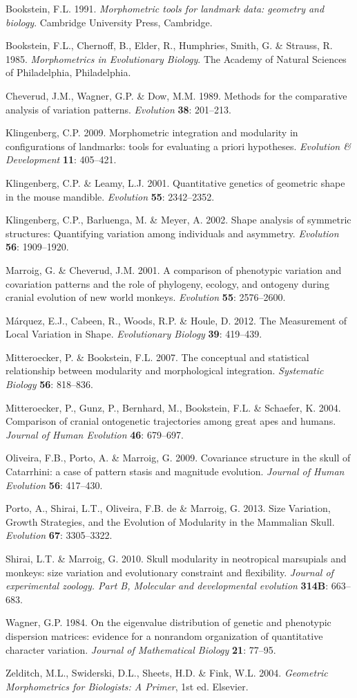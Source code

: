 \documentclass[12pt,]{article}
\begin{document}
Bookstein, F.L. 1991. \emph{Morphometric tools for landmark data:
geometry and biology}. Cambridge University Press, Cambridge.

Bookstein, F.L., Chernoff, B., Elder, R., Humphries, Smith, G. \&
Strauss, R. 1985. \emph{Morphometrics in Evolutionary Biology}. The
Academy of Natural Sciences of Philadelphia, Philadelphia.

Cheverud, J.M., Wagner, G.P. \& Dow, M.M. 1989. Methods for the
comparative analysis of variation patterns. \emph{Evolution}
\textbf{38}: 201--213.

Klingenberg, C.P. 2009. Morphometric integration and modularity in
configurations of landmarks: tools for evaluating a priori hypotheses.
\emph{Evolution \& Development} \textbf{11}: 405--421.

Klingenberg, C.P. \& Leamy, L.J. 2001. Quantitative genetics of
geometric shape in the mouse mandible. \emph{Evolution} \textbf{55}:
2342--2352.

Klingenberg, C.P., Barluenga, M. \& Meyer, A. 2002. Shape analysis of
symmetric structures: Quantifying variation among individuals and
asymmetry. \emph{Evolution} \textbf{56}: 1909--1920.

Marroig, G. \& Cheverud, J.M. 2001. A comparison of phenotypic variation
and covariation patterns and the role of phylogeny, ecology, and
ontogeny during cranial evolution of new world monkeys. \emph{Evolution}
\textbf{55}: 2576--2600.

Márquez, E.J., Cabeen, R., Woods, R.P. \& Houle, D. 2012. The
Measurement of Local Variation in Shape. \emph{Evolutionary Biology}
\textbf{39}: 419--439.

Mitteroecker, P. \& Bookstein, F.L. 2007. The conceptual and statistical
relationship between modularity and morphological integration.
\emph{Systematic Biology} \textbf{56}: 818--836.

Mitteroecker, P., Gunz, P., Bernhard, M., Bookstein, F.L. \& Schaefer,
K. 2004. Comparison of cranial ontogenetic trajectories among great apes
and humans. \emph{Journal of Human Evolution} \textbf{46}: 679--697.

Oliveira, F.B., Porto, A. \& Marroig, G. 2009. Covariance structure in
the skull of Catarrhini: a case of pattern stasis and magnitude
evolution. \emph{Journal of Human Evolution} \textbf{56}: 417--430.

Porto, A., Shirai, L.T., Oliveira, F.B. de \& Marroig, G. 2013. Size
Variation, Growth Strategies, and the Evolution of Modularity in the
Mammalian Skull. \emph{Evolution} \textbf{67}: 3305--3322.

Shirai, L.T. \& Marroig, G. 2010. Skull modularity in neotropical
marsupials and monkeys: size variation and evolutionary constraint and
flexibility. \emph{Journal of experimental zoology. Part B, Molecular
and developmental evolution} \textbf{314B}: 663--683.

Wagner, G.P. 1984. On the eigenvalue distribution of genetic and
phenotypic dispersion matrices: evidence for a nonrandom organization of
quantitative character variation. \emph{Journal of Mathematical Biology}
\textbf{21}: 77--95.

Zelditch, M.L., Swiderski, D.L., Sheets, H.D. \& Fink, W.L. 2004.
\emph{Geometric Morphometrics for Biologists: A Primer}, 1st ed.
Elsevier.
\end{document}
